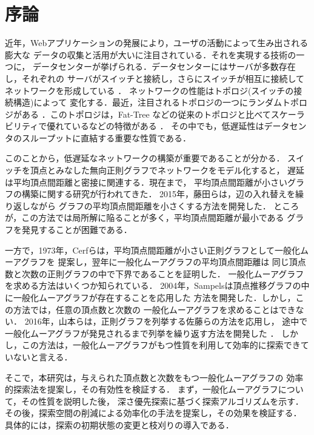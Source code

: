 
\chapter{序論}
近年，Webアプリケーションの発展により，ユーザの活動によって生み出される膨大な
データの収集と活用が大いに注目されている．それを実現する技術の一つに，
データセンターが挙げられる．データセンターにはサーバが多数存在し，それぞれの
サーバがスイッチと接続し，さらにスイッチが相互に接続してネットワークを形成している
\cite{Greenberg2009,Al-Fares2008}．
ネットワークの性能はトポロジ(スイッチの接続構造)によって
変化する．最近，注目されるトポロジの一つにランダムトポロジがある
\cite{Singla2011,Koibuchi2012}．このトポロジは，Fat-Tree\cite{Al-Fares2008}
などの従来のトポロジと比べてスケーラビリティで優れているなどの特徴がある
\cite{Singla2011}．
その中でも，低遅延性はデータセンタのスループットに直結する重要な性質である．

このことから，低遅延なネットワークの構築が重要であることが分かる．
スイッチを頂点とみなした無向正則グラフでネットワークをモデル化すると，
遅延は平均頂点間距離と密接に関連する．現在まで，
平均頂点間距離が小さいグラフの構築に関する研究が行われてきた．
2015年，藤田らは，辺の入れ替えを繰り返しながら
グラフの平均頂点間距離を小さくする方法を開発した\cite{Fujita2015}．
ところが，この方法では局所解に陥ることが多く，平均頂点間距離が最小である
グラフを発見することが困難である．

一方で，1973年，Cerfらは，平均頂点間距離が小さい正則グラフとして一般化ムーアグラフを
提案し\cite{Cerf1973}，翌年に一般化ムーアグラフの平均頂点間距離は
同じ頂点数と次数の正則グラフの中で下界であることを証明した\cite{Cerf1974Lower}．
一般化ムーアグラフを求める方法はいくつか知られている．
2004年，Sampelsは頂点推移グラフの中に一般化ムーアグラフが存在することを応用した
方法を開発した\cite{Sampels2004}．しかし，この方法では，任意の頂点数と次数の
一般化ムーアグラフを求めることはできない．
2016年，山本らは，正則グラフを列挙する佐藤らの方法\cite{Sato2008}を応用し，
途中で一般化ムーアグラフが発見されるまで列挙を繰り返す方法を開発した
\cite{Yamamoto2016}．
しかし，この方法は，一般化ムーアグラフがもつ性質を利用して効率的に探索できて
いないと言える．

そこで，本研究は，与えられた頂点数と次数をもつ一般化ムーアグラフの
効率的探索法を提案し，その有効性を検証する．
まず，一般化ムーアグラフについて，その性質を説明した後，
深さ優先探索に基づく探索アルゴリズムを示す．
その後，探索空間の削減による効率化の手法を提案し，その効果を検証する．
具体的には，探索の初期状態の変更と枝刈りの導入である．

